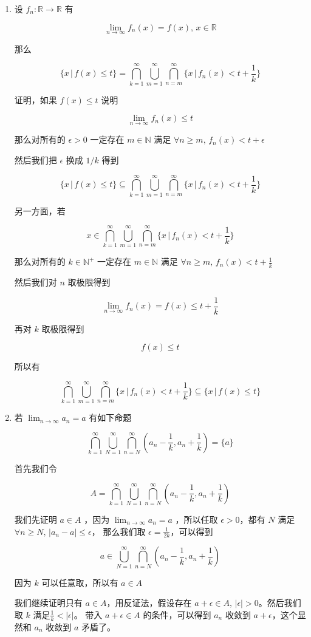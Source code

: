 \documentclass[12pt,a4paper]{ctexart}
\begin{document}
\begin{enumerate}
    \item 设 $f_n: \mathbb{R} \to \mathbb{R}$ 有

\[
\lim_{n \to \infty} f_n(x) = f(x),\, x \in \mathbb{R}
\]

那么

\[
\{ x \,\vert\, f(x) \le t \} = \bigcap_{k=1}^{\infty} \bigcup_{m=1}^{\infty} \bigcap_{n=m}^{\infty}\{ x \,\vert\, f_n(x) < t + \frac{1}{k} \}
\]

证明，如果 $f(x) \le t$ 说明

\[
\lim_{n \to \infty}f_n(x) \le t
\]

那么对所有的 $\epsilon > 0$ 一定存在  $m \in \mathbb{N}$ 满足 $\forall n \ge m,\, f_n(x) < t + \epsilon$

然后我们把 $\epsilon$ 换成 $1/k$ 得到

\[
\{ x \,\vert\, f(x) \le t \} \subseteq \bigcap_{k=1}^{\infty} \bigcup_{m=1}^{\infty} \bigcap_{n=m}^{\infty}\{ x \,\vert\, f_n(x) < t + \frac{1}{k} \}
\]

另一方面，若 

\[
x \in \bigcap_{k=1}^{\infty} \bigcup_{m=1}^{\infty} \bigcap_{n=m}^{\infty}\{ x \,\vert\, f_n(x) < t + \frac{1}{k} \}
\]


那么对所有的 $k \in \mathbb{N}^+$ 一定存在  $m \in \mathbb{N}$ 满足 $\forall n \ge m,\, f_n(x) < t + \frac{1}{k}$

然后我们对 $n$ 取极限得到

\[
\lim_{n \to \infty}f_n(x) = f(x) \le t + \frac{1}{k}
\]

再对 $k$ 取极限得到

\[
f(x) \le t
\]

所以有

\[
\bigcap_{k=1}^{\infty} \bigcup_{m=1}^{\infty} \bigcap_{n=m}^{\infty}\{ x \,\vert\, f_n(x) < t + \frac{1}{k} \} \subseteq \{ x \,\vert \, f(x) \le t \}
\]

\item 若 $\lim_{n \to \infty} a_n = a$ 有如下命题

\[
    \bigcap_{k=1}^{\infty}\bigcup_{N=1}^{\infty}\bigcap_{n=N}^{\infty}(a_n - \frac{1}{k}, a_n + \frac{1}{k}) = \{ a \}
\]

首先我们令

\[
A = \bigcap_{k=1}^{\infty}\bigcup_{N=1}^{\infty}\bigcap_{n=N}^{\infty}(a_n - \frac{1}{k}, a_n + \frac{1}{k}) 
\]

我们先证明 $a \in A$ ，因为 $\lim_{n \to \infty} a_n = a$ ，所以任取 $\epsilon > 0$，都有 $N$ 满足 $\forall n \ge N,\, \lvert a_n - a \rvert \le \epsilon$，
那么我们取 $\epsilon = \frac{1}{2k}$，可以得到

\[
a \in \bigcup_{N=1}^{\infty}\bigcap_{n=N}^{\infty}(a_n - \frac{1}{k}, a_n + \frac{1}{k})
\]

因为 $k$ 可以任意取，所以有 $a \in A$

我们继续证明只有 $a \in A$，用反证法，假设存在 $a + \epsilon \in A,\, \lvert \epsilon \rvert > 0$。然后我们取 $k$ 满足$\frac{1}{k} < \lvert \epsilon \rvert$。
带入 $a + \epsilon \in A$ 的条件，可以得到 $a_n$ 收敛到 $a + \epsilon$，这个显然和 $a_n$ 收敛到 $a$ 矛盾了。


\end{enumerate}
\end{document}
